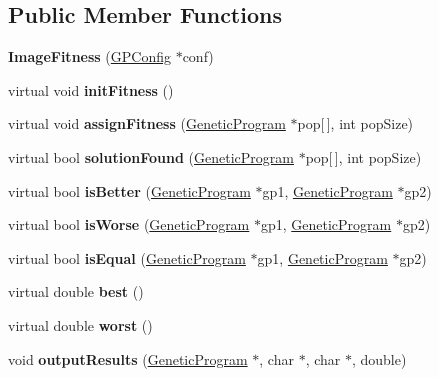 \subsection*{Public Member Functions}
\begin{DoxyCompactItemize}
\item 
\hypertarget{classImageFitness_abe7707371984af9215fcd812b51defef}{}\label{classImageFitness_abe7707371984af9215fcd812b51defef} 
{\bfseries Image\+Fitness} (\hyperlink{classGPConfig}{G\+P\+Config} $\ast$conf)
\item 
\hypertarget{classImageFitness_a87b7ded1718e3a5ddf41855e18c060d3}{}\label{classImageFitness_a87b7ded1718e3a5ddf41855e18c060d3} 
virtual void {\bfseries init\+Fitness} ()
\item 
\hypertarget{classImageFitness_ab7a09b58e0f1aa28eb54e92b1c7c1e39}{}\label{classImageFitness_ab7a09b58e0f1aa28eb54e92b1c7c1e39} 
virtual void {\bfseries assign\+Fitness} (\hyperlink{classGeneticProgram}{Genetic\+Program} $\ast$pop\mbox{[}$\,$\mbox{]}, int pop\+Size)
\item 
\hypertarget{classImageFitness_a20dad1b0e981f8d0e6f968982566b073}{}\label{classImageFitness_a20dad1b0e981f8d0e6f968982566b073} 
virtual bool {\bfseries solution\+Found} (\hyperlink{classGeneticProgram}{Genetic\+Program} $\ast$pop\mbox{[}$\,$\mbox{]}, int pop\+Size)
\item 
\hypertarget{classImageFitness_a8b981e2d67357f1316bce965da2cb511}{}\label{classImageFitness_a8b981e2d67357f1316bce965da2cb511} 
virtual bool {\bfseries is\+Better} (\hyperlink{classGeneticProgram}{Genetic\+Program} $\ast$gp1, \hyperlink{classGeneticProgram}{Genetic\+Program} $\ast$gp2)
\item 
\hypertarget{classImageFitness_ad140d00e2dd89edc72ebceadf8aaee00}{}\label{classImageFitness_ad140d00e2dd89edc72ebceadf8aaee00} 
virtual bool {\bfseries is\+Worse} (\hyperlink{classGeneticProgram}{Genetic\+Program} $\ast$gp1, \hyperlink{classGeneticProgram}{Genetic\+Program} $\ast$gp2)
\item 
\hypertarget{classImageFitness_a49732d7c1838113c37dae1bf102643e9}{}\label{classImageFitness_a49732d7c1838113c37dae1bf102643e9} 
virtual bool {\bfseries is\+Equal} (\hyperlink{classGeneticProgram}{Genetic\+Program} $\ast$gp1, \hyperlink{classGeneticProgram}{Genetic\+Program} $\ast$gp2)
\item 
\hypertarget{classImageFitness_a7906f6594096f7ebaf5e64bcfb56a657}{}\label{classImageFitness_a7906f6594096f7ebaf5e64bcfb56a657} 
virtual double {\bfseries best} ()
\item 
\hypertarget{classImageFitness_a58acec0b8d5e84da69221aab18308c47}{}\label{classImageFitness_a58acec0b8d5e84da69221aab18308c47} 
virtual double {\bfseries worst} ()
\item 
\hypertarget{classImageFitness_a3834397e9a1486dc37b2e4eb133bc84f}{}\label{classImageFitness_a3834397e9a1486dc37b2e4eb133bc84f} 
void {\bfseries output\+Results} (\hyperlink{classGeneticProgram}{Genetic\+Program} $\ast$, char $\ast$, char $\ast$, double)
\end{DoxyCompactItemize}
